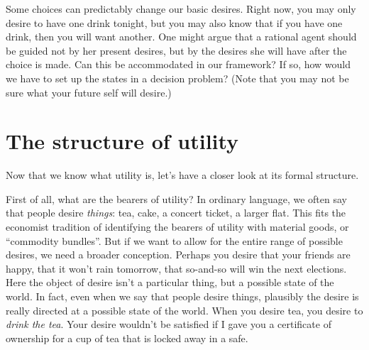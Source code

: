 \begin{exercise}
  Some choices can predictably change our basic desires. Right now,
  you may only desire to have one drink tonight, but you may also know
  that if you have one drink, then you will want another. One might argue
  that a rational agent should be guided not by her present desires,
  but by the desires she will have after the choice is made. Can this
  be accommodated in our framework? If so, how would we have to set up
  the states in a decision problem? (Note that you may not be sure
  what your future self will desire.)
  

\end{exercise}


\section{The structure of utility}\label{sec:structure-of-utility}

Now that we know what utility is, let's have a closer look at its
formal structure.

First of all, what are the bearers of utility? In ordinary language,
we often say that people desire \emph{things}: tea, cake, a concert
ticket, a larger flat. This fits the economist tradition of
identifying the bearers of utility with material goods, or ``commodity
bundles''. But if we want to allow for the entire range of possible
desires, we need a broader conception. Perhaps you desire that your
friends are happy, that it won't rain tomorrow, that so-and-so will
win the next elections. Here the object of desire isn't a particular
thing, but a possible state of the world. In fact, even when we say
that people desire things, plausibly the desire is really directed at
a possible state of the world. When you desire tea, you desire to
\emph{drink the tea}. Your desire wouldn't be satisfied if I gave you
a certificate of ownership for a cup of tea that is locked away in a
safe.

